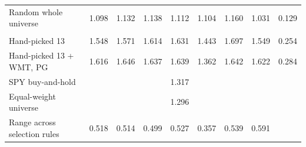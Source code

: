 \begin{table}[H]
\begin{tabular}{l*{8}{r}}
Random whole universe & 1.098 & 1.132 & 1.138 & 1.112 & 1.104 & 1.160 & 1.031 & 0.129 \\
\addlinespace
\multicolumn{9}{l}{\emph{Hand-picked}} \\
Hand-picked 13 & 1.548 & 1.571 & 1.614 & 1.631 & 1.443 & 1.697 & 1.549 & 0.254 \\
Hand-picked 13 + WMT, PG & 1.616 & 1.646 & 1.637 & 1.639 & 1.362 & 1.642 & 1.622 & 0.284 \\
\midrule
SPY buy-and-hold & \multicolumn{7}{c}{1.317} & \\
Equal-weight universe & \multicolumn{7}{c}{1.296} & \\
\midrule
Range across selection rules & 0.518 & 0.514 & 0.499 & 0.527 & 0.357 & 0.539 & 0.591 & \\
\bottomrule
\end{tabular}
\end{table}
